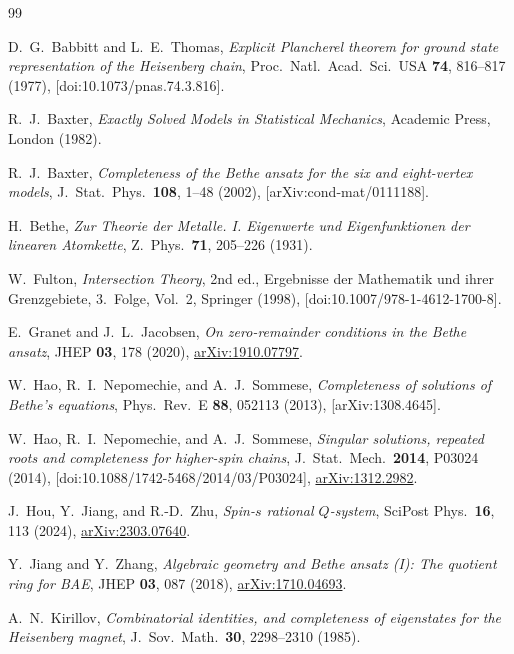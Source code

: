 \documentclass[11pt]{article}
\theoremstyle{definition}
\begin{document}
\begin{thebibliography}{99}

D.~G.~Babbitt and L.~E.~Thomas,
\emph{Explicit Plancherel theorem for ground state representation of the
Heisenberg chain},
Proc.\ Natl.\ Acad.\ Sci.\ USA \textbf{74}, 816--817 (1977),
[doi:10.1073/pnas.74.3.816].

R.~J.~Baxter,
\emph{Exactly Solved Models in Statistical Mechanics},
Academic Press, London (1982).

R.~J.~Baxter,
\emph{Completeness of the Bethe ansatz for the six and eight-vertex models},
J.\ Stat.\ Phys.\ \textbf{108}, 1--48 (2002),
[arXiv:cond-mat/0111188].

H.~Bethe,
\emph{Zur Theorie der Metalle. I. Eigenwerte und Eigenfunktionen der
linearen Atomkette},
Z.\ Phys.\ \textbf{71}, 205--226 (1931).

W.~Fulton,
\emph{Intersection Theory}, 2nd ed.,
Ergebnisse der Mathematik und ihrer Grenzgebiete, 3.\ Folge,
Vol.~2, Springer (1998),
[doi:10.1007/978-1-4612-1700-8].

E.~Granet and J.~L.~Jacobsen,
\emph{On zero-remainder conditions in the Bethe ansatz},
JHEP \textbf{03}, 178 (2020),
\href{https://arxiv.org/abs/1910.07797}{arXiv:1910.07797}.

W.~Hao, R.~I.~Nepomechie, and A.~J.~Sommese,
\emph{Completeness of solutions of Bethe's equations},
Phys.\ Rev.\ E \textbf{88}, 052113 (2013),
[arXiv:1308.4645].

W.~Hao, R.~I.~Nepomechie, and A.~J.~Sommese,
\emph{Singular solutions, repeated roots and completeness for higher-spin chains},
J.\ Stat.\ Mech.\ \textbf{2014}, P03024 (2014),
[doi:10.1088/1742-5468/2014/03/P03024],
\href{https://arxiv.org/abs/1312.2982}{arXiv:1312.2982}.

J.~Hou, Y.~Jiang, and R.-D.~Zhu,
\emph{Spin-$s$ rational $Q$-system},
SciPost Phys.\ \textbf{16}, 113 (2024),
\href{https://arxiv.org/abs/2303.07640}{arXiv:2303.07640}.

Y.~Jiang and Y.~Zhang,
\emph{Algebraic geometry and Bethe ansatz (I): The quotient ring for BAE},
JHEP \textbf{03}, 087 (2018),
\href{https://arxiv.org/abs/1710.04693}{arXiv:1710.04693}.

A.~N.~Kirillov,
\emph{Combinatorial identities, and completeness of eigenstates for the
Heisenberg magnet},
J.\ Sov.\ Math.\ \textbf{30}, 2298--2310 (1985).


\end{thebibliography}
\end{document}
